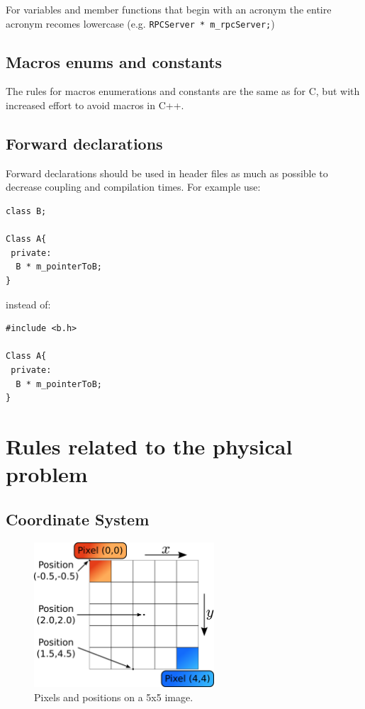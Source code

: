 \documentclass[12pt]{article}
\newenvironment{sourcestyle}{}{}%
\begin{document}
For variables and member functions that begin with an acronym the entire acronym recomes lowercase (e.g. {\tt RPCServer * m\_rpcServer;})
\subsection{Macros enums and constants}
The rules for macros enumerations and constants are the same as for C, but with increased effort to avoid macros in C++.

\subsection{Forward declarations}
Forward declarations should be used in header files as much as possible to decrease coupling and compilation times.
For example use:
\begin{sourcestyle}
\begin{verbatim}
class B;

Class A{
 private:
  B * m_pointerToB;
}
\end{verbatim}
\end{sourcestyle}
instead of:
\begin{sourcestyle}
\begin{verbatim}
#include <b.h>

Class A{
 private:
  B * m_pointerToB;
}
\end{verbatim}
\end{sourcestyle}

\section{Rules related to the physical problem}


\subsection{Coordinate System}
\begin{figure}
  \vspace{-40pt}
  \begin{center}
    \includegraphics[width=0.6\textwidth]{coordinate_diagram}
  \end{center}
  \vspace{-20pt}
  \caption{Pixels and positions on a 5x5 image.}
  \vspace{-10pt}
  \label{Fig:Coordinate}
\end{figure}
\end{document}
